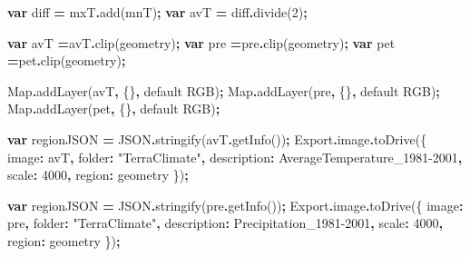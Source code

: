 \documentclass[
  10pt,
  b5paper,
]{book}
\newenvironment{Shaded}{\begin{snugshade}}{\end{snugshade}}
\newcommand{\AttributeTok}[1]{\textcolor[rgb]{0.77,0.63,0.00}{#1}}
\newcommand{\BuiltInTok}[1]{#1}
\newcommand{\DataTypeTok}[1]{\textcolor[rgb]{0.13,0.29,0.53}{#1}}
\newcommand{\DecValTok}[1]{\textcolor[rgb]{0.00,0.00,0.81}{#1}}
\newcommand{\FunctionTok}[1]{\textcolor[rgb]{0.00,0.00,0.00}{#1}}
\newcommand{\KeywordTok}[1]{\textcolor[rgb]{0.13,0.29,0.53}{\textbf{#1}}}
\newcommand{\NormalTok}[1]{#1}
\newcommand{\OperatorTok}[1]{\textcolor[rgb]{0.81,0.36,0.00}{\textbf{#1}}}
\newcommand{\StringTok}[1]{\textcolor[rgb]{0.31,0.60,0.02}{#1}}
\begin{document}
\begin{Shaded}
\begin{Highlighting}[]
\KeywordTok{var}\NormalTok{ diff }\OperatorTok{=}\NormalTok{ mxT}\OperatorTok{.}\FunctionTok{add}\NormalTok{(mnT)}\OperatorTok{;}
\KeywordTok{var}\NormalTok{ avT }\OperatorTok{=}\NormalTok{ diff}\OperatorTok{.}\FunctionTok{divide}\NormalTok{(}\DecValTok{2}\NormalTok{)}\OperatorTok{;}

\KeywordTok{var}\NormalTok{ avT }\OperatorTok{=}\NormalTok{avT}\OperatorTok{.}\FunctionTok{clip}\NormalTok{(geometry)}\OperatorTok{;}
\KeywordTok{var}\NormalTok{ pre }\OperatorTok{=}\NormalTok{pre}\OperatorTok{.}\FunctionTok{clip}\NormalTok{(geometry)}\OperatorTok{;}
\KeywordTok{var}\NormalTok{ pet }\OperatorTok{=}\NormalTok{pet}\OperatorTok{.}\FunctionTok{clip}\NormalTok{(geometry)}\OperatorTok{;}



\BuiltInTok{Map}\OperatorTok{.}\FunctionTok{addLayer}\NormalTok{(avT}\OperatorTok{,}\NormalTok{ \{\}}\OperatorTok{,} \StringTok{\textquotesingle{}default RGB\textquotesingle{}}\NormalTok{)}\OperatorTok{;}
\BuiltInTok{Map}\OperatorTok{.}\FunctionTok{addLayer}\NormalTok{(pre}\OperatorTok{,}\NormalTok{ \{\}}\OperatorTok{,} \StringTok{\textquotesingle{}default RGB\textquotesingle{}}\NormalTok{)}\OperatorTok{;}
\BuiltInTok{Map}\OperatorTok{.}\FunctionTok{addLayer}\NormalTok{(pet}\OperatorTok{,}\NormalTok{ \{\}}\OperatorTok{,} \StringTok{\textquotesingle{}default RGB\textquotesingle{}}\NormalTok{)}\OperatorTok{;}


\KeywordTok{var}\NormalTok{ regionJSON }\OperatorTok{=} \BuiltInTok{JSON}\OperatorTok{.}\FunctionTok{stringify}\NormalTok{(avT}\OperatorTok{.}\FunctionTok{getInfo}\NormalTok{())}\OperatorTok{;}
\NormalTok{Export}\OperatorTok{.}\AttributeTok{image}\OperatorTok{.}\FunctionTok{toDrive}\NormalTok{(\{}
          \DataTypeTok{image}\OperatorTok{:}\NormalTok{ avT}\OperatorTok{,}
          \DataTypeTok{folder}\OperatorTok{:} \StringTok{"TerraClimate"}\OperatorTok{,}
          \DataTypeTok{description}\OperatorTok{:} \StringTok{\textquotesingle{}AverageTemperature\_1981{-}2001\textquotesingle{}}\OperatorTok{,} 
          \DataTypeTok{scale}\OperatorTok{:} \DecValTok{4000}\OperatorTok{,}
          \DataTypeTok{region}\OperatorTok{:}\NormalTok{ geometry}
\NormalTok{\})}\OperatorTok{;}

\KeywordTok{var}\NormalTok{ regionJSON }\OperatorTok{=} \BuiltInTok{JSON}\OperatorTok{.}\FunctionTok{stringify}\NormalTok{(pre}\OperatorTok{.}\FunctionTok{getInfo}\NormalTok{())}\OperatorTok{;}
\NormalTok{Export}\OperatorTok{.}\AttributeTok{image}\OperatorTok{.}\FunctionTok{toDrive}\NormalTok{(\{}
          \DataTypeTok{image}\OperatorTok{:}\NormalTok{ pre}\OperatorTok{,}
          \DataTypeTok{folder}\OperatorTok{:} \StringTok{"TerraClimate"}\OperatorTok{,}
          \DataTypeTok{description}\OperatorTok{:} \StringTok{\textquotesingle{}Precipitation\_1981{-}2001\textquotesingle{}}\OperatorTok{,} 
          \DataTypeTok{scale}\OperatorTok{:} \DecValTok{4000}\OperatorTok{,}
          \DataTypeTok{region}\OperatorTok{:}\NormalTok{ geometry}
\NormalTok{\})}\OperatorTok{;}


\end{Highlighting}
\end{Shaded}
\end{document}
